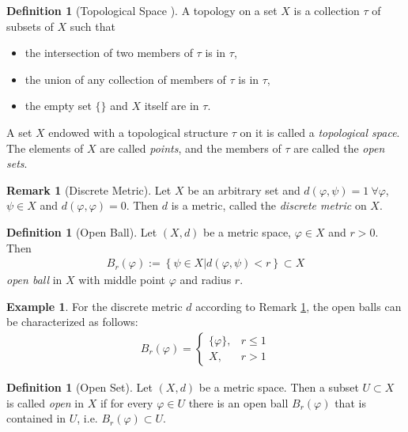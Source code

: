 \documentclass[12pt, a4paper]{article}
\numberwithin{equation}{section}
\theoremstyle{definition}
\theoremstyle{definition}
\newtheorem{defn}[thm]{Definition} %
\newtheorem{exmp}[thm]{Example} %
\newtheorem{remark}[thm]{Remark} %
\begin{document}
	\begin{defn}[Topological Space \cite{topology-singh}]
		A topology on a set $X$ is a collection $\tau$ of subsets of $X$ such that 
		\begin{itemize}
			\item the intersection of two members of $\tau$ is in $\tau$, 
			\item the union of any collection of members of $\tau$ is in $\tau$, 
			\item the empty set $\{\}$ and $X$ itself are in $\tau$.
		\end{itemize}
		A set $X$ endowed with a topological structure $\tau$ on it is called a \textit{topological space}. The elements of $X$ are called \textit{points}, and the members of $\tau$ are called the \textit{open sets}. 
	\end{defn} 
	
	\begin{remark}[Discrete Metric]\label{discrete-metric}
		Let $X$ be an arbitrary set and $d(\varphi, \psi) = 1 \ \forall \varphi$, $\psi\in X$ and $d(\varphi, \varphi) = 0$. Then $d$ is a metric, called the \textit{discrete metric} on $X$. 
	\end{remark}
	
	\begin{defn}[Open Ball]
		Let $(X, d)$ be a metric space, $\varphi\in X$ and $r > 0$. Then 
		\begin{align}
			B_{r}(\varphi) := \left\{ \psi\in X \vert d(\varphi, \psi) < r\right\} \subset X
		\end{align}
		\textit{open ball} in $X$ with middle point $\varphi$ and radius $r$. 
 	\end{defn}
 
 	\begin{exmp}
 		For the discrete metric $d$ according to Remark \ref{discrete-metric}, the open balls can be characterized as follows:
 		\begin{align}
 			B_{r}(\varphi) = \begin{cases}
 				\{\varphi\}, &r \leq 1 
 				\\ X, &r > 1
 			\end{cases}
 		\end{align}
 	\end{exmp} 
	
	\begin{defn}[Open Set]
		\label{defn-open-set}
		Let $(X, d)$ be a metric space. Then a subset $U\subset X$ is called \textit{open} in $X$ if for every $\varphi \in U$ there is an open ball $B_{r}(\varphi)$ that is contained in $U$, i.e. $B_r(\varphi)\subset U$. 
	\end{defn}
\end{document}
